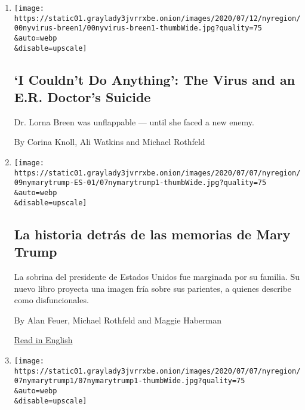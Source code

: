 \begin{enumerate}
\def\labelenumi{\arabic{enumi}.}
\item
  \href{/2020/07/11/nyregion/lorna-breen-suicide-coronavirus.html}{}

  \texttt{[image: https://static01.graylady3jvrrxbe.onion/images/2020/07/12/nyregion/00nyvirus-breen1/00nyvirus-breen1-thumbWide.jpg?quality=75\\\&auto=webp\\\&disable=upscale]}

  \hypertarget{i-couldnt-do-anything-the-virus-and-an-er-doctors-suicide}{%
  \subsection{`I Couldn't Do Anything': The Virus and an E.R. Doctor's
  Suicide}\label{i-couldnt-do-anything-the-virus-and-an-er-doctors-suicide}}

  Dr. Lorna Breen was unflappable --- until she faced a new enemy.

  By Corina Knoll, Ali Watkins and Michael Rothfeld
\item
  \href{/es/2020/07/09/espanol/mundo/libro-mary-trump-sobrina.html}{}

  \texttt{[image: https://static01.graylady3jvrrxbe.onion/images/2020/07/07/nyregion/09nymarytrump-ES-01/07nymarytrump1-thumbWide.jpg?quality=75\\\&auto=webp\\\&disable=upscale]}

  \hypertarget{la-historia-detruxe1s-de-las-memorias-de-mary-trump}{%
  \subsection{La historia detrás de las memorias de Mary
  Trump}\label{la-historia-detruxe1s-de-las-memorias-de-mary-trump}}

  La sobrina del presidente de Estados Unidos fue marginada por su
  familia. Su nuevo libro proyecta una imagen fría sobre sus parientes,
  a quienes describe como disfuncionales.

  By Alan Feuer, Michael Rothfeld and Maggie Haberman

  \href{https://www.nytimes3xbfgragh.onion/2020/07/07/nyregion/mary-trump-book.html}{Read
  in English}
\item
  \href{/2020/07/07/nyregion/mary-trump-book.html}{}

  \texttt{[image: https://static01.graylady3jvrrxbe.onion/images/2020/07/07/nyregion/07nymarytrump1/07nymarytrump1-thumbWide.jpg?quality=75\\\&auto=webp\\\&disable=upscale]}

  \hypertarget{the-inside-story-of-why-mary-trump-wrote-a-tell-all-memoir}{%
}
\end{enumerate}
